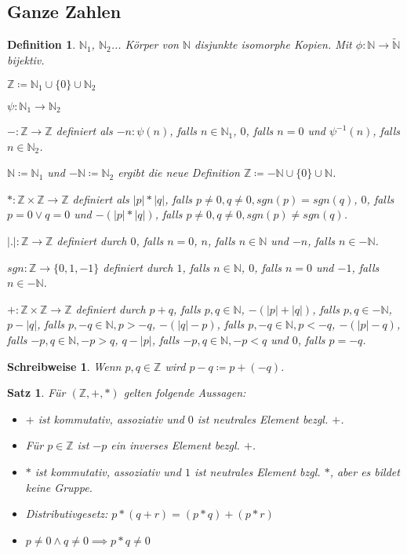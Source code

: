 \documentclass[twocolumn]{article}
\newtheorem{theorem}{Satz}[section]
\newtheorem{definition}{Definition}[section]
\newtheorem*{schreibweise}{Schreibweise}
\begin{document}
\subsection{Ganze Zahlen}
\begin{definition}
	$\mathbb{N}_{1}$, $\mathbb{N}_{2}$... Körper von $\mathbb{N}$ disjunkte isomorphe Kopien. Mit $\phi : \mathbb{N} \rightarrow \tilde{\mathbb{N}}$ bijektiv.
	
	$\mathbb{Z} \coloneqq \mathbb{N}_{1} \cup \{0\} \cup \mathbb{N}_{2}$
	
	$\psi : \mathbb{N}_{1} \rightarrow \mathbb{N}_{2}$
	
	$-:\mathbb{Z} \rightarrow \mathbb{Z}$ definiert als $-n: \psi(n)$, falls $n \in \mathbb{N}_{1}$, $0$, falls $n=0$ und $\psi^{-1}(n)$, falls $n \in \mathbb{N}_{2}$.
	
	$\mathbb{N} \coloneqq \mathbb{N}_{1}$ und $- \mathbb{N} \coloneqq \mathbb{N}_{2}$ ergibt die neue Definition $\mathbb{Z} \coloneqq - \mathbb{N} \cup \{0\} \cup \mathbb{N}$.
	
	$*: \mathbb{Z} \times \mathbb{Z} \rightarrow \mathbb{Z}$ definiert als $|p|*|q|$, falls $p \neq 0, q \neq 0, sgn(p)=sgn(q)$, $0$, falls $p=0 \lor q=0$ und $-(|p|*|q|)$, falls $p \neq 0, q \neq 0, sgn(p) \neq sgn(q)$.
	
	$|.|: \mathbb{Z} \rightarrow \mathbb{Z}$ definiert durch $0$, falls $n=0$, $n$, falls $n \in \mathbb{N}$ und $-n$, falls $n \in -\mathbb{N}$.
	
	$sgn: \mathbb{Z} \rightarrow \{0, 1, -1\}$ definiert durch $1$, falls $n \in \mathbb{N}$, $0$, falls $n = 0$ und $-1$, falls $n \in - \mathbb{N}$.
	
	$+: \mathbb{Z} \times \mathbb{Z} \rightarrow \mathbb{Z}$ definiert durch $p+q$, falls $p, q \in \mathbb{N}$, $-(|p|+|q|)$, falls $p,q \in -\mathbb{N}$, $p-|q|$, falls $p,-q \in \mathbb{N}, p > -q$, $-(|q|-p)$, falls $p,-q \in \mathbb{N}, p < -q$, $-(|p|-q)$, falls $-p,q \in \mathbb{N}, -p>q$, $q-|p|$, falls $-p,q \in \mathbb{N}, -p<q$ und $0$, falls $p=-q$.
\end{definition}

\begin{schreibweise}
	Wenn $p,q \in \mathbb{Z}$ wird $p-q \coloneqq p+(-q)$.
\end{schreibweise}

\begin{theorem}
	Für $(\mathbb{Z},+,*)$ gelten folgende Aussagen:
	
	\begin{itemize}
		\item $+$ ist kommutativ, assoziativ und $0$ ist neutrales Element bezgl. $+$.
		\item Für $p \in \mathbb{Z}$ ist $-p$ ein inverses Element bezgl. $+$.
		\item $*$ ist kommutativ, assoziativ und $1$ ist neutrales Element bzgl. $*$, aber es bildet keine Gruppe.
		\item Distributivgesetz: $p*(q+r)=(p*q)+(p*r)$
		\item $p \neq 0 \land q \neq 0 \implies p * q \neq 0$
	\end{itemize}
\end{theorem}
\end{document}
